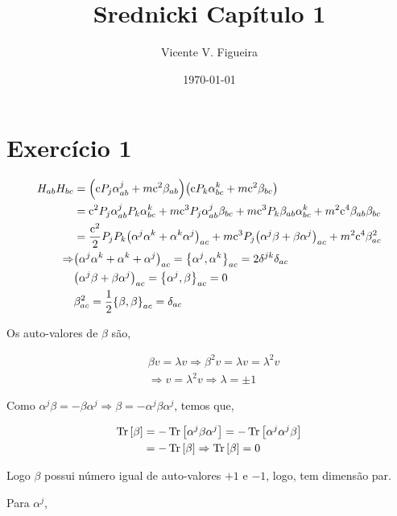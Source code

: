 \documentclass[twoside]{amsart}
\title{
Srednicki Capítulo 1
}
\author{
  Vicente V. Figueira
       }
\date{\today}
\numberwithin{equation}{section}
\begin{document}
\maketitle

\tableofcontents


\section{Exercício 1}

\begin{align*}
    H_{ab}H_{bc}&=\qty(\luz P_j\alpha^j_{ab}+m\luz^2\beta_{ab})\qty(\luz P_k\alpha^k_{bc}+m\luz^2\beta_{bc})\\
    &=\luz^2P_j\alpha^j_{ab}P_k\alpha^k_{bc}+m\luz^3P_j\alpha^j_{ab}\beta_{bc}+m\luz^3 P_k\beta_{ab}\alpha^k_{bc}+m^2\luz^4\beta_{ab}\beta_{bc}\\
    &=\frac{\luz^2}{2}P_jP_k\qty(\alpha^j\alpha^k+\alpha^k\alpha^j)_{ac}+m\luz^3P_j\qty(\alpha^j\beta+\beta\alpha^j)_{ac}+m^2\luz^4\beta^2_{ac}\\
    \Rightarrow &\qty(\alpha^j\alpha^k+\alpha^k+\alpha^j)_{ac}=\acomm{\alpha^j}{\alpha^k}_{ac}=2\delta^{jk}\delta_{ac}\\
    &\qty(\alpha^j\beta+\beta\alpha^j)_{ac}=\acomm{\alpha^j}{\beta}_{ac}=0\\
    &\beta^2_{ac}=\frac12\acomm{\beta}{\beta}_{ac}=\delta_{ac}
\end{align*}

Os auto-valores de $\beta$ são,

\begin{align*}
    &\beta v = \lambda v\Rightarrow \beta^2 v=\lambda v= \lambda^2 v\\
    &\Rightarrow v=\lambda^2 v\Rightarrow \lambda =\pm 1
\end{align*}

Como $\alpha^j\beta=-\beta\alpha ^j\Rightarrow \beta=-\alpha^j\beta\alpha^j$, temos que,

\begin{align*}
    \Tr\qty[\beta]&=-\Tr\qty[\alpha^j\beta\alpha^j]=-\Tr\qty[\alpha^j\alpha^j\beta]\\
    &=-\Tr\qty[\beta]\Rightarrow\Tr\qty[\beta]=0
\end{align*}

Logo $\beta$ possui número igual de auto-valores $+1$ e $-1$, logo, tem dimensão par.

Para $\alpha^j$,
\end{document}
